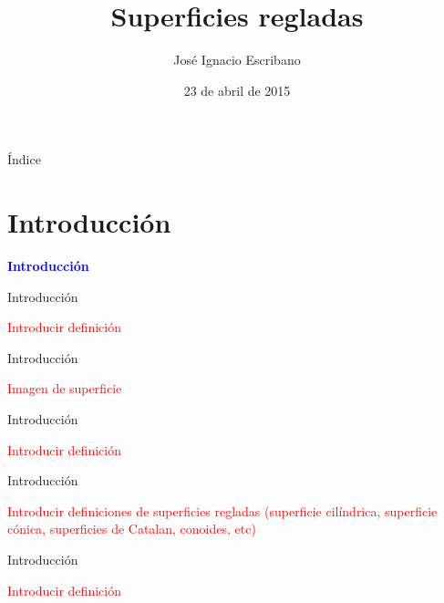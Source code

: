 \documentclass[11pt]{beamer}
\author{José Ignacio Escribano}
\title{Superficies regladas}
\date{23 de abril de 2015}
\institute[URJC]{\texttt{[image: logoURJC.jpg]}}
\begin{document}
	\begin{frame}[plain]
		\maketitle
	\end{frame}
	
	\begin{frame}{Índice}
		\tableofcontents
	\end{frame}
	
	
	\section{Introducción}
	
	\begin{frame}
		\begin{center}
			\Huge\textbf{\textsf{\textcolor{blue}{Introducción}}}
		\end{center}
	\end{frame}
	
	
	\begin{frame}{Introducción}
		\begin{defi}[de superficie]
			\textcolor{red}{Introducir definición}
		\end{defi}
	\end{frame}
	
	\begin{frame}{Introducción}
		\begin{ejemplo}[de superficie]
			\textcolor{red}{Imagen de superficie}
		\end{ejemplo}	
	\end{frame}
	
	\begin{frame}{Introducción}
		\begin{defi}
			\textcolor{red}{Introducir definición}
		\end{defi}	
	\end{frame}
	
	\begin{frame}{Introducción}
		\begin{defi}
			\textcolor{red}{Introducir definiciones de superficies regladas (superficie cilíndrica, superficie cónica, superficies de Catalan, conoides, etc)}
		\end{defi}	
	\end{frame}
	
	\begin{frame}{Introducción}
		\begin{defi}
			\textcolor{red}{Introducir definición}
		\end{defi}	
	\end{frame}
	
\end{document}
